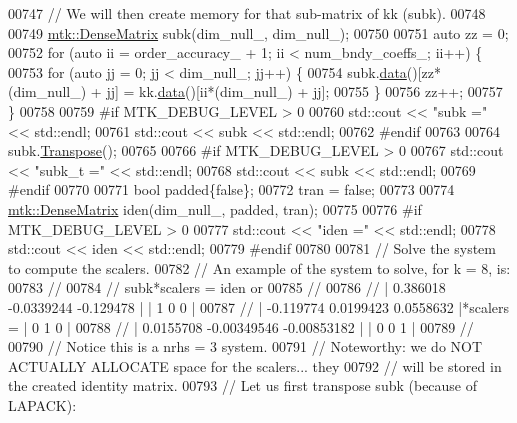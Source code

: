 \begin{DoxyCode}
{{00747   \textcolor{comment}{// We will then create memory for that sub-matrix of kk (subk).}
00748 
00749   \hyperlink{classmtk_1_1DenseMatrix}{mtk::DenseMatrix} subk(dim\_null\_, dim\_null\_);
00750 
00751   \textcolor{keyword}{auto} zz = 0;
00752   \textcolor{keywordflow}{for} (\textcolor{keyword}{auto} ii = order\_accuracy\_ + 1; ii < num\_bndy\_coeffs\_; ii++) \{
00753     \textcolor{keywordflow}{for} (\textcolor{keyword}{auto} jj = 0; jj < dim\_null\_; jj++) \{
00754       subk.\hyperlink{classmtk_1_1DenseMatrix_a0c33b8a9e01d157c61ddbdf807c25d84}{data}()[zz*(dim\_null\_) + jj] = kk.\hyperlink{classmtk_1_1DenseMatrix_a0c33b8a9e01d157c61ddbdf807c25d84}{data}()[ii*(dim\_null\_) + jj];
00755     \}
00756     zz++;
00757   \}
00758 
00759 \textcolor{preprocessor}{  #if MTK\_DEBUG\_LEVEL > 0}
00760   std::cout << \textcolor{stringliteral}{"subk ="} << std::endl;
00761   std::cout << subk << std::endl;
00762 \textcolor{preprocessor}{  #endif}
00763 
00764   subk.\hyperlink{classmtk_1_1DenseMatrix_a71d9c07ca66e88d97d1fd5012f43138b}{Transpose}();
00765 
00766 \textcolor{preprocessor}{  #if MTK\_DEBUG\_LEVEL > 0}
00767   std::cout << \textcolor{stringliteral}{"subk\_t ="} << std::endl;
00768   std::cout << subk << std::endl;
00769 \textcolor{preprocessor}{  #endif}
00770 
00771   \textcolor{keywordtype}{bool} padded\{\textcolor{keyword}{false}\};
00772   tran = \textcolor{keyword}{false};
00773 
00774   \hyperlink{classmtk_1_1DenseMatrix}{mtk::DenseMatrix} iden(dim\_null\_, padded, tran);
00775 
00776 \textcolor{preprocessor}{  #if MTK\_DEBUG\_LEVEL > 0}
00777   std::cout << \textcolor{stringliteral}{"iden ="} << std::endl;
00778   std::cout << iden << std::endl;
00779 \textcolor{preprocessor}{  #endif}
00780 
00781   \textcolor{comment}{// Solve the system to compute the scalers.}
00782   \textcolor{comment}{// An example of the system to solve, for k = 8, is:}
00783   \textcolor{comment}{//}
00784   \textcolor{comment}{// subk*scalers = iden or}
00785   \textcolor{comment}{//}
00786   \textcolor{comment}{// |  0.386018  -0.0339244   -0.129478 |           | 1 0 0 |}
00787   \textcolor{comment}{// | -0.119774   0.0199423   0.0558632 |*scalers = | 0 1 0 |}
00788   \textcolor{comment}{// | 0.0155708 -0.00349546 -0.00853182 |           | 0 0 1 |}
00789   \textcolor{comment}{//}
00790   \textcolor{comment}{// Notice this is a nrhs = 3 system.}
00791   \textcolor{comment}{// Noteworthy: we do NOT ACTUALLY ALLOCATE space for the scalers... they}
00792   \textcolor{comment}{// will be stored in the created identity matrix.}
00793   \textcolor{comment}{// Let us first transpose subk (because of LAPACK):}
}}
\end{DoxyCode}
